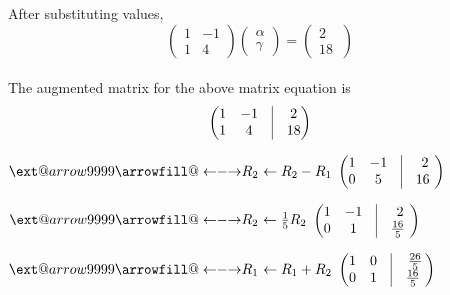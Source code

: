 \documentclass[10pt,a4paper]{article}
\makeatletter
\newcommand\xleftrightarrow[2][]{%
  \ext@arrow 9999{\longleftrightarrowfill@}{#1}{#2}}
\newcommand\longleftrightarrowfill@{%
  \arrowfill@\leftarrow\relbar\rightarrow}
\makeatother
\begin{document}
\begin{multicols}{2}
{After substituting values,
\begin{equation}
  \begin{pmatrix}
1 & -1\\
1 &4
\end{pmatrix} 
\begin{pmatrix}
\alpha\\
\gamma
\end{pmatrix} 
=
\begin{pmatrix}
2\\ 
 18\
\end{pmatrix}
\end{equation}\vspace{2mm}\\


The augmented matrix for the above matrix equation is 
\vspace{3mm}
\begin{equation}
\begin{pmatrix}
  1 & -1 & \vrule & 2\\
  1 & 4  &\vrule & 18
    \end{pmatrix}  
    \end{equation} 
    
  \begin{center}
  $ \xleftrightarrow{\text{$R_2$ $\leftarrow {R_2}-{R_1}$}} $
$\begin{pmatrix}
 1 & -1& \vrule & 2\\
 0 & 5  &\vrule & 16\
  \end{pmatrix}$
  \\
  \end{center}
  
  \begin{center}
$ \xleftrightarrow{\text{$R_2$ $\leftarrow  \frac{1}{5}{R_2}$}} $
$\begin{pmatrix}
 1 & -1 & \vrule & 2\\
  0 & 1  &\vrule & \frac{16}{5}\
  \end{pmatrix}$
  \\
  \end{center}    
  
  \begin{center}
  $ \xleftrightarrow{\text{$R_1$ $\leftarrow  {R_1}+{R_2}$}} $
$\begin{pmatrix}
  1 & 0 & \vrule & \frac{26}{5}\\
  0 & 1  &\vrule & \frac{16}{5}\
  \end{pmatrix}$
  \\
  \end{center}

}
\end{multicols}
\end{document}
